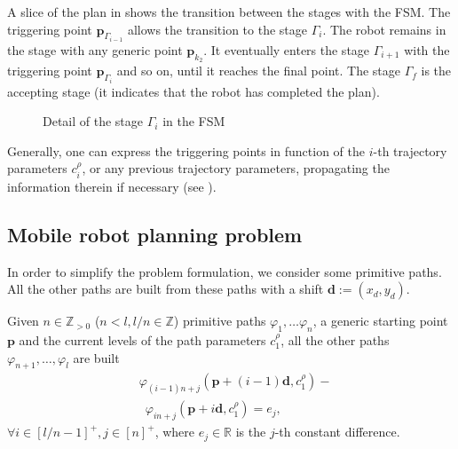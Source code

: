 A slice of the plan in  shows the transition between the stages with the FSM. The triggering point $\mathbf{p}_{\Gamma_{i-1}}$ allows the transition to the stage $\Gamma_i$. The robot remains in the stage with any generic point $\mathbf{p}_{k_2}$. It eventually enters the stage $\Gamma_{i+1}$ with the triggering point $\mathbf{p}_{\Gamma_i}$ and so on, until it reaches the final point. The stage $\Gamma_f$ is the accepting stage (it indicates that the robot has completed the plan).

\begin{figure}[h]
  \center
\caption[Detail of a stage in the FSM]{Detail of the stage $\Gamma_i$ in the FSM}
\label{fig:state-machine2}
\end{figure}
    
Generally, one can express the triggering points in function of the $i$-th trajectory parameters $c_{i}^{\rho}$, or any previous trajectory parameters, propagating the information therein if necessary (see ).
   

\subsection{Mobile robot planning problem}

In order to simplify the problem formulation, we consider some primitive paths. All the other paths are built from these paths with a shift $\mathbf{d}:=(x_d,y_d)$.

Given $n\in\mathbb{Z}_{>0}$ ($n<l,l/n\in\mathbb{Z}$) primitive paths $\varphi_1,\dots\varphi_n$, a generic starting point $\mathbf{p}$ and the current levels of the path parameters $c_1^\rho$, all the other paths $\varphi_{n+1},\dots,\varphi_l$ are built
\begin{equation}\label{eq:primitive}\begin{split}
  &\varphi_{(i-1)n+j}(\mathbf{p}+(i-1)\mathbf{d},c_1^\rho)-\\ &\,\,\,\varphi_{in+j}(\mathbf{p}+i\mathbf{d},c_1^\rho)=e_j,
\end{split}\end{equation}
$\forall i\in[l/n-1]^+,j\in[n]^+$, where $e_j\in\mathbb{R}$ is the $j$-th constant difference.

